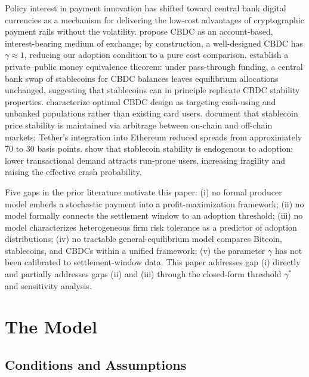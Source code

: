 \documentclass{article}
\begin{document}
Policy interest in payment innovation has shifted toward central bank digital
currencies as a mechanism for delivering the low-cost advantages of
cryptographic payment rails without the volatility.
\citet{bordo2017} propose CBDC as an account-based, interest-bearing medium of
exchange; by construction, a well-designed CBDC has $\gamma \approx 1$,
reducing our adoption condition to a pure cost comparison.
\citet{brunnermeier2019} establish a private--public money equivalence theorem:
under pass-through funding, a central bank swap of stablecoins for
CBDC balances leaves equilibrium allocations unchanged, suggesting that
stablecoins can in principle replicate CBDC stability properties.
\citet{agur2022} characterize optimal CBDC design as targeting cash-using and
unbanked populations rather than existing card users.
\citet{lyons2023} document that stablecoin price stability is maintained via
arbitrage between on-chain and off-chain markets; Tether's integration into
Ethereum reduced spreads from approximately 70 to 30 basis points.
\citet{bertsch2023} show that stablecoin stability is endogenous to adoption:
lower transactional demand attracts run-prone users, increasing fragility and
raising the effective crash probability.

Five gaps in the prior literature motivate this paper:
(i) no formal producer model embeds a stochastic payment into a
    profit-maximization framework;
(ii) no model formally connects the settlement window to an adoption threshold;
(iii) no model characterizes heterogeneous firm risk tolerance as a predictor
    of adoption distributions;
(iv) no tractable general-equilibrium model compares Bitcoin, stablecoins, and
    CBDCs within a unified framework;
(v) the parameter $\gamma$ has not been calibrated to settlement-window data.
This paper addresses gap (i) directly and partially addresses gaps (ii) and
(iii) through the closed-form threshold $\gamma^*$ and sensitivity analysis.

\section{The Model}
\label{sec:model}

\subsection{Conditions and Assumptions}
\label{sec:assumptions}
\end{document}
